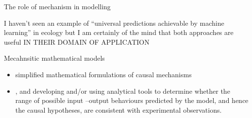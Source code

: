 \documentclass[
  ignorenonframetext,
]{beamer}
\providecommand{\tightlist}{%
  \setlength{\itemsep}{0pt}\setlength{\parskip}{0pt}}
\begin{document}
\begin{frame}{The role of mechanism in modelling}
\begin{block}{}
I haven't seen an example of ``universal predictions achievable by
machine learning'' in ecology but I am certainly of the mind that both
approaches are useful IN THEIR DOMAIN OF APPLICATION
\end{block}

\begin{block}{Mecahnsitic mathematical models}
\protect\hypertarget{mecahnsitic-mathematical-models}{}
\begin{itemize}
\tightlist
\item
  simplified mathematical formulations of causal mechanisms
\item
  , and developing and/or using analytical tools to determine whether
  the range of possible input --output behaviours predicted by the
  model, and hence the causal hypotheses, are consistent with
  experimental observations.
\end{itemize}
\end{block}
\end{frame}
\end{document}
